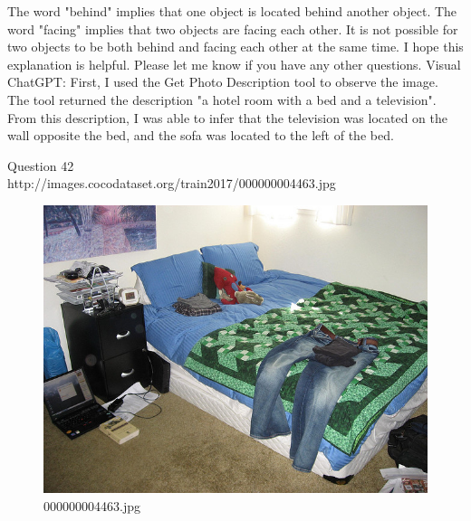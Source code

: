 \begin{enumerate}
    The word "behind" implies that one object is located behind another object.
    The word "facing" implies that two objects are facing each other.
    It is not possible for two objects to be both behind and facing each other at the same time.
    I hope this explanation is helpful. Please let me know if you have any other questions.
    \subitem Visual ChatGPT: First, I used the Get Photo Description tool to observe the image. The tool returned the description "a hotel room with a bed and a television". From this description, I was able to infer that the television was located on the wall opposite the bed, and the sofa was located to the left of the bed.
\end{enumerate}
Question 42\\
http://images.cocodataset.org/train2017/000000004463.jpg
\begin{figure}[h]
    \centering
    \includegraphics[width=0.8\linewidth]{../image set/hard/000000004463.jpg}
    \caption{000000004463.jpg}
\end{figure}
